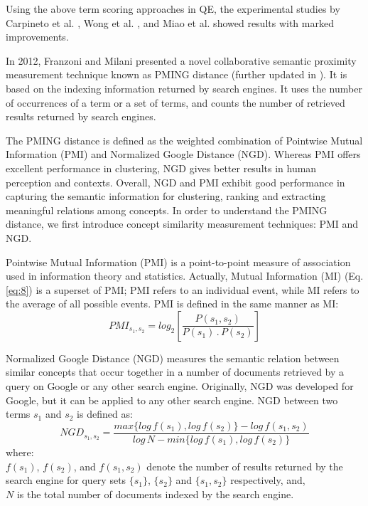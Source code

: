 Using the above term scoring approaches in QE, the experimental studies by Carpineto et al. \cite{carpineto2001information}, Wong et al. \cite{wong2008re}, and Miao et al. \cite{miao2012proximity} showed results with marked improvements.

In 2012, Franzoni and Milani \cite{franzoni2012pming} presented a novel collaborative semantic proximity measurement technique known as PMING distance (further updated in \cite{franzoni2017just}). It is based on the indexing information returned by search engines. It uses the number of occurrences of a term or a set of terms, and counts the number of retrieved results returned by search engines. 

The PMING distance is defined as the weighted combination of Pointwise Mutual Information (PMI) and Normalized Google Distance (NGD). Whereas PMI offers excellent performance in clustering, NGD gives better results in human perception and contexts. Overall, NGD and PMI exhibit good performance in capturing the semantic information for clustering, ranking and extracting meaningful relations among concepts.
In order to understand the PMING distance, we first introduce concept similarity measurement techniques: PMI and NGD.

Pointwise Mutual Information (PMI) \cite{church1990word} is a point-to-point measure of association used in information theory and statistics. Actually, Mutual Information (MI) (Eq. \ref{eq:8}) is a superset of PMI; PMI refers to an individual event, while MI refers to the average of all possible events. PMI is defined in the same manner as MI:
\begin{equation}\label{eq:PMI}
PMI_{s_1, s_2}= log_2 \left[\frac{P(s_1, s_2)}{P(s_1)\,.\, P(s_2)}\right]
\end{equation}

Normalized Google Distance (NGD) \cite{cilibrasi2007google} measures the semantic relation between similar concepts that occur together in a number of documents retrieved by a query on Google or any other search engine. Originally, NGD was developed for Google, but it can be applied to any other search engine. NGD between two terms $s_1$ and $s_2$ is defined as:
\begin{equation}\label{eq:NGD}
NGD_{s_1, s_2}= \frac {max \{log\, f(s_1),log\, f(s_2)\}- log\, f(s_1, s_2)}{log\, N- min \{log\, f(s_1),log\, f(s_2)\}}
\end{equation}
where:\\
$f(s_1)$,  $f(s_2)$, and  $f(s_1, s_2)$ denote the number of results returned by the search engine for query sets   $\{s_1\}$,  $\{s_2\}$ and $\{s_1, s_2\}$ respectively, and,\\
$N$ is the total number of documents indexed by the search engine.

